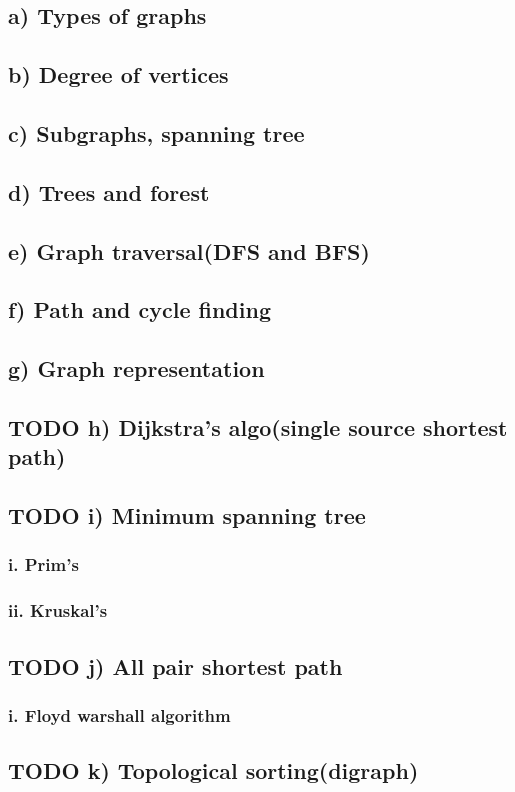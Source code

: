 \documentclass[11pt]{article}
\begin{document}
\subsection{a) Types of graphs}
\label{sec:orgaec347a}
\subsection{b) Degree of vertices}
\label{sec:org21588a0}
\subsection{c) Subgraphs, spanning tree}
\label{sec:orgdde8898}
\subsection{d) Trees and forest}
\label{sec:orgea40cef}
\subsection{e) Graph traversal(DFS and BFS)}
\label{sec:orgdce3366}
\subsection{f) Path and cycle finding}
\label{sec:org4bfde85}
\subsection{g) Graph representation}
\label{sec:org3d69989}
\subsection{{\bfseries\sffamily TODO} h) Dijkstra's algo(single source shortest path)}
\label{sec:orgc5727e7}
\subsection{{\bfseries\sffamily TODO} i) Minimum spanning tree}
\label{sec:org472f62d}
\subsubsection{i. Prim's}
\label{sec:org7333618}
\subsubsection{ii. Kruskal's}
\label{sec:orgc55d399}
\subsection{{\bfseries\sffamily TODO} j) All pair shortest path}
\label{sec:orgc1c90e8}
\subsubsection{i. Floyd warshall algorithm}
\label{sec:org5bfad50}
\subsection{{\bfseries\sffamily TODO} k) Topological sorting(digraph)}
\label{sec:orgf4f9c82}
\end{document}
